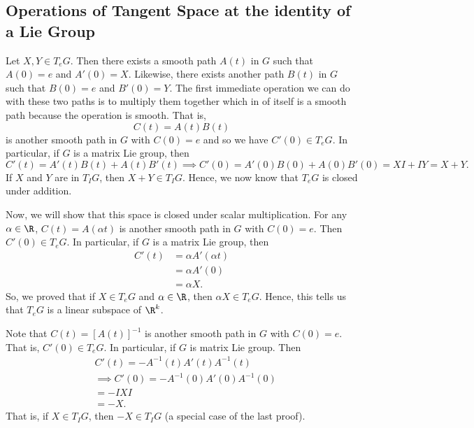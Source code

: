 \subsection{Operations of Tangent Space at the identity of a Lie Group}

Let \( X,Y \in {T}_{e}G \). Then there exists a smooth path \( A(t) \) in \( G  \) such that \( A(0) = e  \) and \( A'(0) =  X \). Likewise, there exists another path \( B(t)  \) in \( G  \) such that \( B(0) = e  \) and \( B'(0) = Y  \). The first immediate operation we can do with these two paths is to multiply them together which in of itself is a smooth path because the operation is smooth. That is,  
\[  C(t) = A(t) B(t)  \]
is another smooth path in \( G  \) with \( C(0) = e  \) and so we have \( C'(0 ) \in {T}_{e}G \). In particular, if \( G  \) is a matrix Lie group, then
\[ C'(t) = A'(t) B(t) + A(t) B'(t) \implies C'(0) = A'(0) B(0) + A(0) B'(0) = X I + I Y = X  + Y.   \]
If \( X  \) and \( Y  \) are in \( {T}_{I}G  \), then \( X + Y  \in {T}_{I}G\). Hence, we now know that \( {T}_{e}G \) is closed under addition.

Now, we will show that this space is closed under scalar multiplication. For any \( \alpha \in \R  \), \( C(t) = A(\alpha t)  \) is another smooth path in \( G  \) with \( C(0) = e  \). Then \( C'(0) \in {T}_{e}G \). In particular, if \( G  \) is a matrix Lie group, then  
\begin{align*}
    C'(t) &= \alpha A'(\alpha t )  \\
          &= \alpha A'(0) \\
          &= \alpha X. 
\end{align*} 
So, we proved that if \( X \in {T}_{e}G \) and \( \alpha \in \R  \), then \( \alpha X \in {T}_{e} G  \). Hence, this tells us that \( {T}_{e}G  \) is a linear subspace of \( \R^{k} \). 

Note that \( C(t) = [A(t)]^{-1} \) is another smooth path in \( G  \) with \( C(0) = e  \). That is, \( C'(0) \in {T}_{e}G \). In particular, if \( G  \) is matrix Lie group. Then
\begin{align*}
    &C'(t) = - A^{-1}(t) A'(t) A^{-1}(t)   \\
    &\implies C'(0) = - A^{-1}(0) A'(0) A^{-1}(0) \\
    &= - I X I  \\
    &= - X.
\end{align*}
That is, if \( X \in {T}_{I} G  \), then \( - X \in {T}_{I}G \) (a special case of the last proof).

